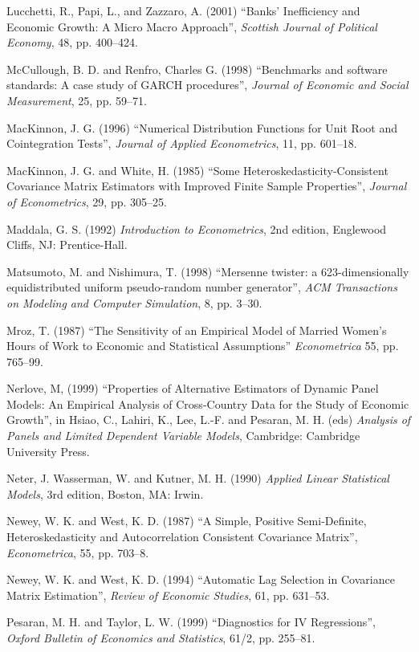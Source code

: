 \begin{thebibliography}
  Lucchetti, R., Papi, L., and Zazzaro, A. (2001) ``Banks'
  Inefficiency and Economic Growth: A Micro Macro Approach'',
  \emph{Scottish Journal of Political Economy}, 48, pp. 400--424.

  McCullough, B. D. and Renfro, Charles G. (1998) ``Benchmarks and
  software standards: A case study of GARCH procedures'',
  \emph{Journal of Economic and Social Measurement}, 25, pp. 59--71.

  MacKinnon, J. G. (1996) ``Numerical Distribution Functions for Unit
  Root and Cointegration Tests'', \emph{Journal of Applied
    Econometrics}, 11, pp. 601--18.
  
  MacKinnon, J. G. and White, H.  (1985) ``Some
  Heteroskedasticity-Consistent Covariance Matrix Estimators with
  Improved Finite Sample Properties'', \emph{Journal of Econometrics},
  29, pp. 305--25.
  
  Maddala, G. S. (1992) \emph{Introduction to Econometrics}, 2nd
  edition, Englewood Cliffs, NJ: Prentice-Hall.
  
  Matsumoto, M. and Nishimura, T.  (1998) ``Mersenne twister: a
  623-dimensionally equidistributed uniform pseudo-random number
  generator'', \emph{ACM Transactions on Modeling and Computer
    Simulation}, 8, pp. 3--30.

  Mroz, T. (1987) ``The Sensitivity of an Empirical Model of Married
  Women's Hours of Work to Economic and Statistical Assumptions''
  \emph{Econometrica} 55, pp. 765--99.

  Nerlove, M, (1999) ``Properties of Alternative Estimators of Dynamic
  Panel Models: An Empirical Analysis of Cross-Country Data for the
  Study of Economic Growth'', in Hsiao, C., Lahiri, K., Lee, L.-F. and
  Pesaran, M. H. (eds) \emph{Analysis of Panels and Limited Dependent
    Variable Models}, Cambridge: Cambridge University Press.
    
  Neter, J. Wasserman, W. and Kutner, M. H. (1990) \emph{Applied
    Linear Statistical Models}, 3rd edition, Boston, MA: Irwin.

  Newey, W. K. and West, K. D. (1987) ``A Simple, Positive
  Semi-Definite, Heteroskedasticity and Autocorrelation Consistent
  Covariance Matrix'', \emph{Econometrica}, 55, pp. 703--8.

  Newey, W. K. and West, K. D. (1994) ``Automatic Lag Selection in
  Covariance Matrix Estimation'', \emph{Review of Economic Studies},
  61, pp. 631--53.

  Pesaran, M. H. and Taylor, L. W. (1999) ``Diagnostics for IV
  Regressions'', \emph{Oxford Bulletin of Economics and Statistics},
  61/2, pp. 255--81.


\end{thebibliography}
